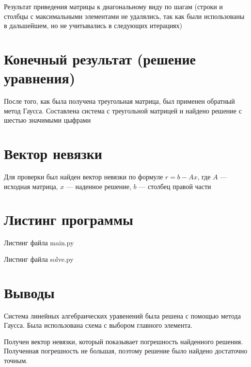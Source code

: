 Результат приведения матрицы к диагональному виду по шагам
(строки и столбцы с максимальными элементами не удалялись, так как были использованы в дальшейшем,
но не учитывались в следующих итерациях)

\lstset{inputencoding=utf8, extendedchars=\true}


\chapter{Конечный результат (решение уравнения)}

После того, как была получена треугольная матрица, был применен обратный метод Гаусса.
Составлена система с треугольной матрицей и найдено решение с шестью значимыми цыфрами

\lstset{inputencoding=utf8, extendedchars=\true}


\chapter{Вектор невязки}

Для проверки был найден вектор невязки по формуле $r = b - Ax$, где $A$ --- исходная матрица, $x$ ---
наденное решение, $b$ --- столбец правой части

\lstset{inputencoding=utf8, extendedchars=\true}


\chapter{Листинг программы}

Листинг файла main.py
\lstset{inputencoding=utf8, extendedchars=\true}


Листинг файла solve.py
\lstset{inputencoding=utf8, extendedchars=\true}


\chapter*{Выводы}

Система линейных алгебраических уравенений была решена с помощью метода Гаусса.
Была использована схема с выбором главного элемента.

Получен вектор невязки, который показывает погрешность найденного решения.
Полученная погрешность не большая, поэтому решение было найдено достаточно точным.



